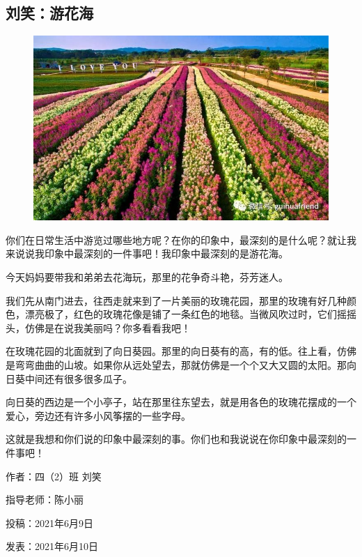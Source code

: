 \vspace{10pt}

{\centering\subsection*{刘笑：游花海}}


\renewcommand{\leftmark}{刘笑：游花海}

\begin{figure}[htbp]

\centering

\includegraphics[width = .5\textwidth]{./ch/6.jpg}

\end{figure}





你们在日常生活中游览过哪些地方呢？在你的印象中，最深刻的是什么呢？就让我来说说我印象中最深刻的一件事吧！我印象中最深刻的是游花海。

今天妈妈要带我和弟弟去花海玩，那里的花争奇斗艳，芬芳迷人。

我们先从南门进去，往西走就来到了一片美丽的玫瑰花园，那里的玫瑰有好几种颜色，漂亮极了，红色的玫瑰花像是铺了一条红色的地毯。当微风吹过时，它们摇摇头，仿佛是在说我美丽吗？你多看看我吧！

在玫瑰花园的北面就到了向日葵园。那里的向日葵有的高，有的低。往上看，仿佛是弯弯曲曲的山坡。如果你从远处望去，那就仿佛是一个个又大又圆的太阳。那向日葵中间还有很多很多瓜子。

向日葵的西边是一个小亭子，站在那里往东望去，就是用各色的玫瑰花摆成的一个爱心，旁边还有许多小风筝摆的一些字母。

这就是我想和你们说的印象中最深刻的事。你们也和我说说在你印象中最深刻的一件事吧！





\vspace{10pt}



作者：四（2）班 刘笑



指导老师：陈小丽



投稿：2021年6月9日



发表：2021年6月10日














                



\vspace{10pt}

\hline



